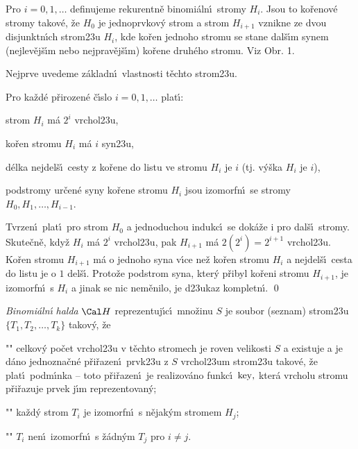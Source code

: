 \flushpar Pro $i=0,1,\dots$ definujeme rekurentn\v e binomi\'aln\'\i\ 
stromy $H_i$.  Jsou to ko\v renov\'e stromy takov\'e, \v ze $H_0$ je 
jednoprvkov\'y strom a  strom $H_{i+1}$ vznikne ze dvou 
disjunktn\'\i ch strom\accent23u $H_i$, kde ko\v ren jednoho stromu  
se stane dal\v s\'\i m synem (nejlev\v ej\v s\'\i m nebo nejprav\v ej\v s\'\i m) ko\v rene druh\'eho stromu.  Viz 
Obr.  1. 
\medskip

\midinsert
\centerline{}
\endcaption
\endinsert

\flushpar Nejprve uvedeme z\'akladn\'\i\ vlastnosti t\v echto 
strom\accent23u.
\medskip

Pro ka\v zd\'e p\v rirozen\'e \v c\'\i slo $
i=0,1,\dots$ 
plat\'\i :
\roster
\item
strom $H_i$ m\'a $2^i$ vrchol\accent23u,
\item
ko\v ren stromu $H_i$ m\'a $i$ syn\accent23u,
\item
d\'elka nejdel\v s\'\i\ cesty z ko\v rene do listu ve stromu $H_i$ je 
$i$ (tj. v\'y\v ska $H_i$ je $i$),
\item
podstromy ur\v cen\'e syny ko\v rene stromu $H_i$ jsou izomorf\-n\'\i\ 
se stromy $H_0,H_1,\dots,H_{i-1}$.
\endroster
\endproclaim

Tvrzen\'\i\ plat\'\i\ pro strom $H_0$ a 
jednoduchou indukc\'\i\ se dok\'a\v ze i pro dal\v s\'\i\ stromy. 
Skute\v cn\v e, kdy\v z $H_i$ m\'a $2^i$ vrchol\accent23u, pak $H_{
i+1}$ m\'a 
$2(2^i)=2^{i+1}$ vrchol\accent23u. Ko\v ren stromu $H_{i+1}$ m\'a o jednoho 
syna v\'\i ce ne\v z ko\v ren stromu $H_i$ a nejdel\v s\'\i\ cesta do listu je o $
1$ 
del\v s\'\i . Proto\v ze podstrom syna, kter\'y p\v ribyl ko\v reni stromu 
$H_{i+1}$, je izomorfn\'\i\ s $H_i$ a jinak se nic nem\v enilo, je 
d\accent23ukaz kompletn\'\i . \qed
\enddemo
\medskip

\flushpar\emph{Binomi\'aln\'\i} \emph{halda} $\Cal H$ reprezentuj\'\i c\'\i\ 
mno\v zinu $S$ je soubor (seznam) strom\accent23u $\{T_1,T_2,\dots
,T_k\}$ 
takov\'y, \v ze 
\roster
\item"{}"
celkov\'y po\v cet vrchol\accent23u v t\v echto stromech je 
roven velikosti $S$ a 
existuje a je d\'ano jednozna\v cn\'e p\v ri\v razen\'\i\ prvk\accent23u 
z $S$ vrchol\accent23um strom\accent23u takov\'e, \v ze plat\'\i\ 
podm\'\i nka  -- toto p\v ri\v razen\'\i\ je realizov\'ano 
funkc\'\i\ 
$\operatorname{key},$ kter\'a vrcholu stromu p\v ri\v razuje prvek j\'\i m reprezentovan\'y;
\item"{}"
ka\v zd\'y strom $T_i$ je izomorfn\'\i\ s n\v ejak\'ym stromem $H_
j$;
\item"{}"
$T_i$ nen\'\i\ izomorfn\'\i\ s \v z\'adn\'ym $T_j$ pro $i\ne j$.
\endroster
\medskip


